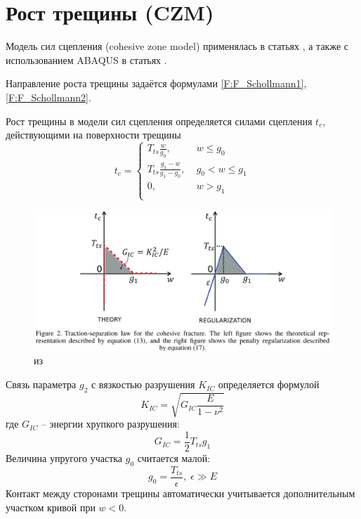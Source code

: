 \section{Рост трещины (CZM)}
Модель сил сцепления (cohesive zone model) применялась в статьях \cite{Liu2016, Liu2017, Paul2018}, а также с использованием ABAQUS в статьях \cite{Zielonka2014, Haddad2016}.

Направление роста трещины задаётся формулами \eqref{F:F_Schollmann1}, \eqref{F:F_Schollmann2}.

Рост трещины в модели сил сцепления определяется силами сцепления $t_c$, действующими на поверхности трещины
\begin{equation}
t_c =
\begin{cases}
T_{ts}\frac{w}{g_0}, & \mathrm{}\; w\leqslant g_0 \\
T_{ts}\frac{g_1-w}{g_1-g_0} , & \mathrm{}\; g_0<w\leqslant g_1\\
0, & \mathrm{}\; w>g_1 \\
\end{cases}
\label{F:CZM}
\end{equation}
\begin{figure}[h!]
	\centering
	\includegraphics[height=0.3\textheight]{pictures/CZM_ts.png}
	\caption{из \cite{Liu2016}}
	\label{fig:CZM_ts}
\end{figure}
Связь параметра $g_2$ с вязкостью разрушения $K_{IC}$ определяется формулой \cite{Irwin1997}
\begin{equation}
K_{IC}=\sqrt{G_{IC}\frac{E}{1-\nu^2}}
\label{F:CZM1}
\end{equation}
где $G_{IC}$ -- энергии хрупкого разрушения:
\begin{equation}
G_{IC}=\frac{1}{2}T_{ts}g_1
\label{F:CZM2}
\end{equation}
Величина упругого участка $g_0$ считается малой:
\begin{equation}
g_0=\frac{T_{ts}}{\epsilon},\;\epsilon\gg E
\label{F:CZM3}
\end{equation}
Контакт между сторонами трещины автоматически учитывается дополнительным участком кривой при $w<0$.

